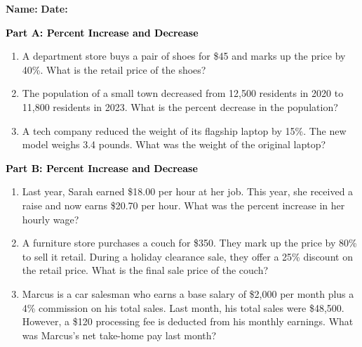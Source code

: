 \documentclass[12pt, letterpaper, fleqn]{article}
\begin{document}
\textbf{Name:} \underline{\hspace{5cm}}
\hfill
\textbf{Date:} \underline{\hspace{3cm}}\\

\begin{tcolorbox}[colback=customteal!20]
\large\textcolor{black}{\textbf{Part A: Percent Increase and Decrease}}
\end{tcolorbox}

\vspace{3mm}

\begin{enumerate}[itemsep=2.5cm, leftmargin=0.6cm]
\item A department store buys a pair of shoes for \$45 and marks up the price by 40\%. What is the retail price of the shoes?
\item The population of a small town decreased from 12,500 residents in 2020 to 11,800 residents in 2023. What is the percent decrease in the population?
\item A tech company reduced the weight of its flagship laptop by 15\%. The new model weighs 3.4 pounds. What was the weight of the original laptop?
\end{enumerate}

\newpage

\begin{tcolorbox}[colback=customteal!20]
\large\textcolor{black}{\textbf{Part B: Percent Increase and Decrease}}
\end{tcolorbox}

\vspace{3mm}

\begin{enumerate}[itemsep=2.5cm, leftmargin=0.6cm, resume]
\item Last year, Sarah earned \$18.00 per hour at her job. This year, she received a raise and now earns \$20.70 per hour. What was the percent increase in her hourly wage?
\item A furniture store purchases a couch for \$350. They mark up the price by 80\% to sell it retail. During a holiday clearance sale, they offer a 25\% discount on the retail price. What is the final sale price of the couch?
\item Marcus is a car salesman who earns a base salary of \$2,000 per month plus a 4\% commission on his total sales. Last month, his total sales were \$48,500. However, a \$120 processing fee is deducted from his monthly earnings. What was Marcus's net take-home pay last month?
\end{enumerate}
\end{document}
